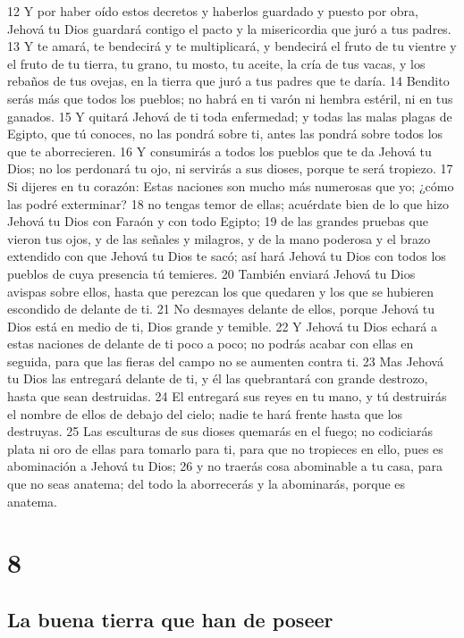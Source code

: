 12 Y por haber oído estos decretos y haberlos guardado y puesto por obra, Jehová tu Dios guardará contigo el pacto y la misericordia que juró a tus padres.
13 Y te amará, te bendecirá y te multiplicará, y bendecirá el fruto de tu vientre y el fruto de tu tierra, tu grano, tu mosto, tu aceite, la cría de tus vacas, y los rebaños de tus ovejas, en la tierra que juró a tus padres que te daría.
14 Bendito serás más que todos los pueblos; no habrá en ti varón ni hembra estéril, ni en tus ganados.
15 Y quitará Jehová de ti toda enfermedad; y todas las malas plagas de Egipto, que tú conoces, no las pondrá sobre ti, antes las pondrá sobre todos los que te aborrecieren.
16 Y consumirás a todos los pueblos que te da Jehová tu Dios; no los perdonará tu ojo, ni servirás a sus dioses, porque te será tropiezo.
17 Si dijeres en tu corazón: Estas naciones son mucho más numerosas que yo; ¿cómo las podré exterminar?
18 no tengas temor de ellas; acuérdate bien de lo que hizo Jehová tu Dios con Faraón y con todo Egipto;
19 de las grandes pruebas que vieron tus ojos, y de las señales y milagros, y de la mano poderosa y el brazo extendido con que Jehová tu Dios te sacó; así hará Jehová tu Dios con todos los pueblos de cuya presencia tú temieres.
20 También enviará Jehová tu Dios avispas sobre ellos, hasta que perezcan los que quedaren y los que se hubieren escondido de delante de ti.
21 No desmayes delante de ellos, porque Jehová tu Dios está en medio de ti, Dios grande y temible.
22 Y Jehová tu Dios echará a estas naciones de delante de ti poco a poco; no podrás acabar con ellas en seguida, para que las fieras del campo no se aumenten contra ti.
23 Mas Jehová tu Dios las entregará delante de ti, y él las quebrantará con grande destrozo, hasta que sean destruidas.
24 El entregará sus reyes en tu mano, y tú destruirás el nombre de ellos de debajo del cielo; nadie te hará frente hasta que los destruyas.
25 Las esculturas de sus dioses quemarás en el fuego; no codiciarás plata ni oro de ellas para tomarlo para ti, para que no tropieces en ello, pues es abominación a Jehová tu Dios;
26 y no traerás cosa abominable a tu casa, para que no seas anatema; del todo la aborrecerás y la abominarás, porque es anatema.

\chapter{8}


\section{La buena tierra que han de poseer}


